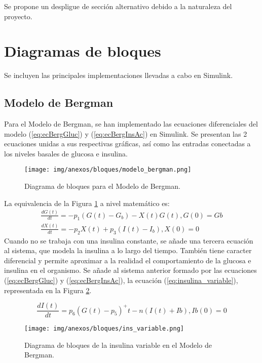 Se propone un despligue de sección alternativo debido a la naturaleza del proyecto.

\section{Diagramas de bloques}

Se incluyen las principales implementaciones llevadas a cabo en Simulink.
\clearpage
\subsection{Modelo de Bergman}

Para el Modelo de Bergman, se han implementado las ecuaciones diferenciales del modelo (\ref{eq:ecBergGluc}) y (\ref{eq:ecBergInsAc}) en Simulink. Se presentan las 2 ecuaciones unidas a sus respectivas gráficas, así como las entradas conectadas a los niveles basales de glucosa e insulina.

\begin{figure}[htbp]
    \centering
    \texttt{[image: img/anexos/bloques/modelo\_bergman.png]}
    \caption{Diagrama de bloques para el Modelo de Bergman.}
    \label{fig:diag_bergman}
\end{figure}

La equivalencia de la Figura \ref{fig:diag_bergman} a nivel matemático es:
\begin{align}
    \frac{dG(t)}{dt}= -p_1 (G(t) - G_b) - X(t)G(t) , G(0) = Gb
    \label{eq:ecBergGluc}\\
    \frac{dX(t)}{dt}= -p_2 X(t) + p_3(I(t) - I_b),    X(0) = 0
    \label{eq:ecBergInsAc}
\end{align}
\clearpage
Cuando no se trabaja con una insulina constante, se añade una tercera ecuación al sistema, que modela la insulina a lo largo del tiempo. También tiene caracter diferencial y permite aproximar a la realidad el comportamiento de la glucosa e insulina en el organismo. 
Se añade al sistema anterior formado por las ecuaciones (\ref{eq:ecBergGluc}) y (\ref{eq:ecBergInsAc}), la ecuación (\ref{eq:insulina_variable}), representada en la Figura \ref{fig:diag_ins_var}.

\begin{equation}
    \frac{dI(t)}{dt} = p_6 (G(t)-p_5)^+ t -n(I(t)+Ib), Ib(0)=0
    \label{eq:insulina_variable}
\end{equation}

\begin{figure}[htbp]
    \centering
    \texttt{[image: img/anexos/bloques/ins\_variable.png]}
    \caption{Diagrama de bloques de la insulina variable en el Modelo de Bergman.}
    \label{fig:diag_ins_var}
\end{figure}

